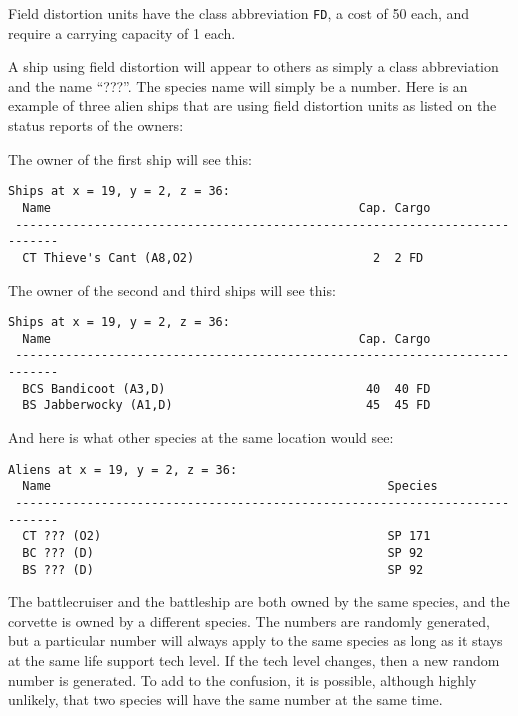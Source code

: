 \documentclass[10pt,titlepage]{article}
\begin{document}
Field distortion units have the class abbreviation \texttt{FD}, a cost of 50 each,
and require a carrying capacity of 1 each.

A ship using field distortion will appear to others as simply a class
abbreviation and the name ``???''.  The species name will simply be a number. 
Here is an example of three alien ships that are using field distortion units
as listed on the status reports of the owners:


The owner of the first ship will see this:

\begin{verbatim}
Ships at x = 19, y = 2, z = 36:
  Name                                           Cap. Cargo
 ----------------------------------------------------------------------------
  CT Thieve's Cant (A8,O2)                         2  2 FD\end{verbatim} 


The owner of the second and third ships will see this:

\begin{verbatim}
Ships at x = 19, y = 2, z = 36:
  Name                                           Cap. Cargo
 ----------------------------------------------------------------------------
  BCS Bandicoot (A3,D)                            40  40 FD
  BS Jabberwocky (A1,D)                           45  45 FD\end{verbatim} 


And here is what other species at the same location would see:

\begin{verbatim}
Aliens at x = 19, y = 2, z = 36:
  Name                                               Species
 ----------------------------------------------------------------------------
  CT ??? (O2)                                        SP 171
  BC ??? (D)                                         SP 92
  BS ??? (D)                                         SP 92\end{verbatim} 


The battlecruiser and the battleship are both owned by the same species,
and the corvette is owned by a different species.  The numbers are randomly
generated, but a particular number will always apply to the same species as
long as it stays at the same life support tech level.  If the tech level
changes, then a new random number is generated.  To add to the confusion,
it is possible, although highly unlikely, that two species will have the
same number at the same time.
\end{document}
